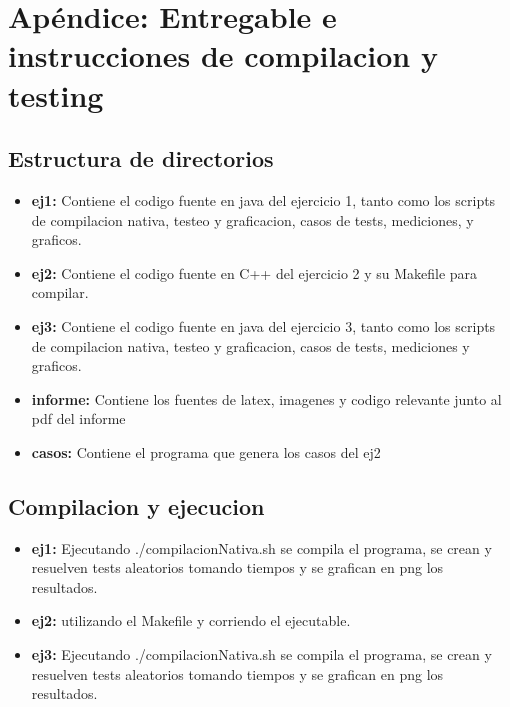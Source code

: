\section{Ap\'endice: Entregable e instrucciones de compilacion y testing}
\subsection{Estructura de directorios}
\begin{itemize}
	\item \textbf{ej1:} Contiene el codigo fuente en java del ejercicio 1, tanto como los scripts de compilacion nativa, testeo y graficacion, casos de tests, mediciones, y graficos.
	\item \textbf{ej2:} Contiene el codigo fuente en C++ del ejercicio 2 y su Makefile para compilar.
	\item \textbf{ej3:} Contiene el codigo fuente en java del ejercicio 3, tanto como los scripts de compilacion nativa, testeo y graficacion, casos de tests, mediciones y graficos.
	\item \textbf{informe:} Contiene los fuentes de latex, imagenes y codigo relevante junto al pdf del informe 
	\item \textbf{casos:}	Contiene el programa que genera los casos del ej2
\end{itemize}

\subsection{Compilacion y ejecucion}
\begin{itemize}
	\item \textbf{ej1:} Ejecutando ./compilacionNativa.sh se compila el programa, se crean y resuelven tests aleatorios tomando tiempos y se grafican en png los resultados.
	\item \textbf{ej2:} utilizando el Makefile y corriendo el ejecutable.
	\item \textbf{ej3:} Ejecutando ./compilacionNativa.sh se compila el programa, se crean y resuelven tests aleatorios tomando tiempos y se grafican en png los resultados.
\end{itemize}

